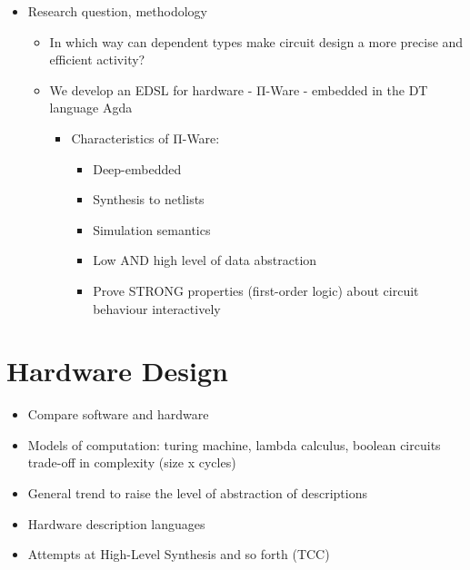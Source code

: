 \documentclass[a4paper]{article}
\begin{document}
        \begin{itemize}
            \item Research question, methodology
            \begin{itemize}
                \item In which way can dependent types make circuit design a more precise and efficient activity?
                \item We develop an EDSL for hardware - Π-Ware - embedded in the DT language Agda
                \begin{itemize}
                    \item Characteristics of Π-Ware:
                    \begin{itemize}
                        \item Deep-embedded
                        \item Synthesis to netlists
                        \item Simulation semantics
                        \item Low AND high level of data abstraction
                        \item Prove STRONG properties (first-order logic) about circuit behaviour interactively
                    \end{itemize}
                \end{itemize}
            \end{itemize}
        \end{itemize}


    \section{Hardware Design}
    \label{sec:hardware}
        \begin{itemize}
            \item Compare software and hardware
            \item Models of computation: turing machine, lambda calculus, boolean circuits
                \subitem trade-off in complexity (size x cycles)

            \item General trend to raise the level of abstraction of descriptions
            \item Hardware description languages

            \item Attempts at High-Level Synthesis and so forth (TCC)
        \end{itemize}
\end{document}

